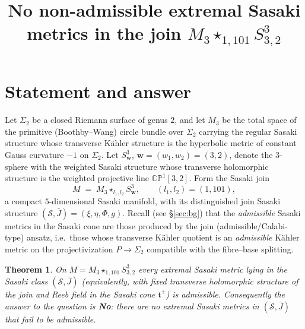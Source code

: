 \documentclass{amsart}
\newtheorem{theorem}{Theorem}
\theoremstyle{definition}
\begin{document}
\title{No non-admissible extremal Sasaki metrics in the join
$M_3\star_{1,101}S^3_{3,2}$}
\maketitle

\section{Statement and answer}

Let $\Sigma_2$ be a closed Riemann surface of genus $2$, and let $M_3$ be the
total space of the primitive (Boothby--Wang) circle bundle over $\Sigma_2$
carrying the regular Sasaki structure whose transverse K\"ahler structure is
the hyperbolic metric of constant Gauss curvature $-1$ on $\Sigma_2$. Let
$S^3_{\mathbf w}$, $\mathbf w=(w_1,w_2)=(3,2)$, denote the $3$-sphere with the
weighted Sasaki structure whose transverse holomorphic structure is the
weighted projective line $\mathbb{CP}^1[3,2]$. Form the Sasaki join
\begin{equation}\label{eq:join}
  M \;=\; M_3 \star_{l_1,l_2} S^3_{\mathbf w},\qquad
  (l_1,l_2)=(1,101),
\end{equation}
a compact $5$-dimensional Sasaki manifold, with its distinguished join Sasaki
structure $(\mathcal S,\bar J)=(\xi,\eta,\Phi,g)$. Recall (see \S\ref{sec:bg})
that the \emph{admissible} Sasaki metrics in the Sasaki cone are those produced
by the join (admissible/Calabi-type) ansatz, i.e.\ those whose transverse
K\"ahler quotient is an \emph{admissible} K\"ahler metric on the
projectivization $P\to\Sigma_2$ compatible with the fibre--base splitting.

\begin{theorem}\label{thm:main}
On $M=M_3\star_{1,101}S^3_{3,2}$ \emph{every} extremal Sasaki metric lying in
the Sasaki class $(\mathcal S,\bar J)$ (equivalently, with fixed transverse
holomorphic structure of the join and Reeb field in the Sasaki cone
$\mathfrak t^+$) is admissible. Consequently the answer to the question is
\textbf{No}: there are no extremal Sasaki metrics in $(\mathcal S,\bar J)$ that
fail to be admissible.
\end{theorem}
\end{document}
